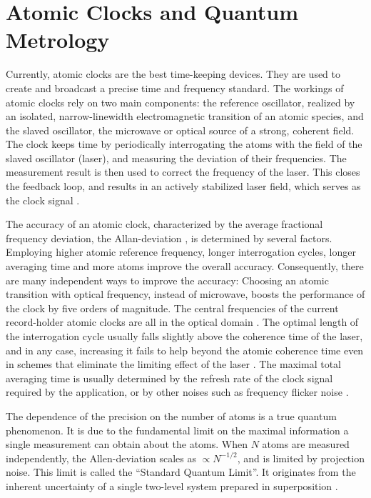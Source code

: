 \section{Atomic Clocks and Quantum Metrology}
Currently, atomic clocks are the best time-keeping devices. They are
used to create and broadcast a precise time and
frequency standard. The workings of atomic clocks rely on two main components: the
reference oscillator, realized by an isolated, narrow-linewidth electromagnetic
transition of an atomic species, \cite{Derevianko2011} and the slaved
oscillator, the microwave or optical source of a strong, coherent field. The
clock keeps time by periodically interrogating the atoms with the field of the
slaved oscillator (laser), and measuring the deviation of their frequencies.
The measurement result is then used to correct the frequency of the laser.
This closes the feedback loop, and results in an actively stabilized laser
field, which serves as the clock signal \cite{Diddams2004}.

The accuracy of an atomic clock, characterized by the average fractional
frequency deviation, the Allan-deviation \cite{Allan1966, Rutman1978}, is
determined by several factors. Employing higher atomic reference frequency,
longer interrogation cycles, longer averaging time and more atoms improve
the overall accuracy. Consequently, there are many independent ways to improve
the accuracy:
Choosing an atomic transition with optical frequency, instead of microwave,
boosts the performance of the clock by five orders of magnitude. The central
frequencies of the current record-holder atomic clocks are all in the optical
domain \cite{Ludlow2015}. The optimal length of the interrogation cycle usually falls
slightly above the coherence time of the laser, and in any case, increasing it
fails to help beyond the atomic coherence time even in schemes that eliminate
the limiting effect of the laser \cite{Borregaard2013, Rosenband2013}. The
maximal total averaging time is usually determined by the refresh rate of the
clock signal required by the application, or by other noises such as frequency
flicker noise \cite{Barnes1966}.

The dependence of the precision on the number of atoms is a true quantum
phenomenon.
It is due to the fundamental limit on the maximal information a single
measurement can obtain about the atoms. When $N$ atoms are measured
independently, the Allen-deviation scales as $\propto N^{-1/2}$, and is limited
by projection noise. This limit is called the ``Standard Quantum Limit''. It
originates from the inherent uncertainty of a single two-level system prepared in superposition \cite{Santarelli1998}.
 
